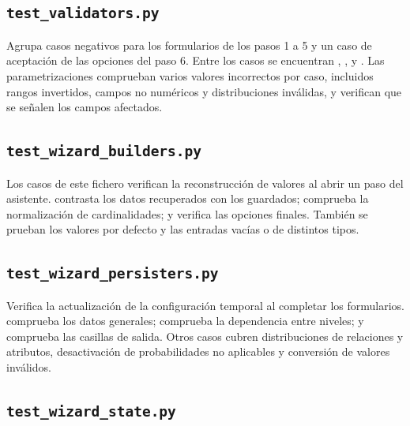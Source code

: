 \subsection{\texttt{test\_validators.py}}

Agrupa casos negativos para los formularios de los pasos 1 a 5 y un caso de
aceptación de las opciones del paso 6. Entre los casos se encuentran
,
,
 y
.
Las parametrizaciones comprueban varios valores incorrectos por caso, incluidos
rangos invertidos, campos no numéricos y distribuciones inválidas, y verifican
que se señalen los campos afectados.

\subsection{\texttt{test\_wizard\_builders.py}}

Los casos de este fichero verifican la reconstrucción de valores al abrir un
paso del asistente. 
contrasta los datos recuperados con los guardados;
comprueba la normalización de cardinalidades; y
 verifica las
opciones finales. También se prueban los valores por defecto y las entradas
vacías o de distintos tipos.

\subsection{\texttt{test\_wizard\_persisters.py}}

Verifica la actualización de la configuración temporal al completar los
formularios.  comprueba
los datos generales; 
comprueba la dependencia entre niveles; y
 comprueba las
casillas de salida. Otros casos cubren distribuciones de relaciones y atributos,
desactivación de probabilidades no aplicables y conversión de valores inválidos.

\subsection{\texttt{test\_wizard\_state.py}}

